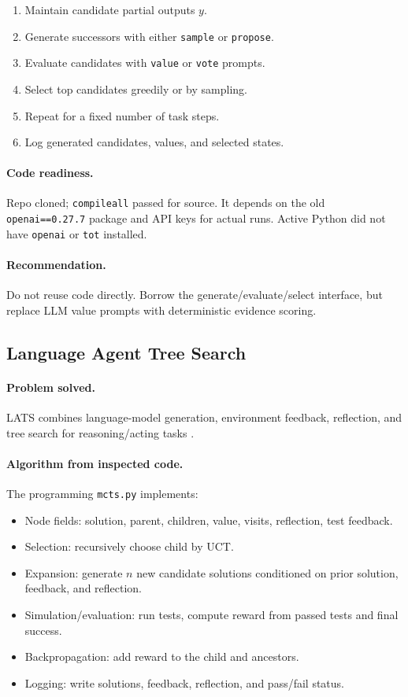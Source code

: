 \documentclass[11pt]{article}
\newcommand{\UCT}{\textsc{UCT}}
\begin{document}
\begin{enumerate}[leftmargin=*]
\item Maintain candidate partial outputs \(y\).
\item Generate successors with either \texttt{sample} or \texttt{propose}.
\item Evaluate candidates with \texttt{value} or \texttt{vote} prompts.
\item Select top candidates greedily or by sampling.
\item Repeat for a fixed number of task steps.
\item Log generated candidates, values, and selected states.
\end{enumerate}

\paragraph{Code readiness.}
Repo cloned; \texttt{compileall} passed for source. It depends on the old
\texttt{openai==0.27.7} package and API keys for actual runs. Active Python did
not have \texttt{openai} or \texttt{tot} installed.

\paragraph{Recommendation.}
Do not reuse code directly. Borrow the generate/evaluate/select interface, but
replace LLM value prompts with deterministic evidence scoring.

\subsection{Language Agent Tree Search}

\paragraph{Problem solved.}
LATS combines language-model generation, environment feedback, reflection, and
tree search for reasoning/acting tasks \cite{zhou2023lats}.

\paragraph{Algorithm from inspected code.}
The programming \texttt{mcts.py} implements:

\begin{itemize}[leftmargin=*]
\item Node fields: solution, parent, children, value, visits, reflection, test
  feedback.
\item Selection: recursively choose child by \UCT.
\item Expansion: generate \(n\) new candidate solutions conditioned on prior
  solution, feedback, and reflection.
\item Simulation/evaluation: run tests, compute reward from passed tests and
  final success.
\item Backpropagation: add reward to the child and ancestors.
\item Logging: write solutions, feedback, reflection, and pass/fail status.
\end{itemize}
\end{document}
